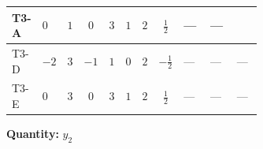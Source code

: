 \documentclass[8pt]{article}
\begin{document}
\begin{landscape}
\begin{longtable}{@{}llcccccc >{\raggedright\arraybackslash}p{0.21\linewidth} >{\raggedright\arraybackslash}p{0.21\linewidth} >{\raggedright\arraybackslash}p{0.21\linewidth}@{}}
\midrule
T3-A & $0$ & $1$ & $0$ & $3$ & $1$ & $2$ & $\frac{1}{2}$ & --- & --- & \scriptsize\adjustbox{max width=\linewidth}{$\begin{gathered} +\frac{1}{2} (\left({y_1}\,\left({y_1}\right)^{\dagger}\,{y_2}\right)_{ij}+\left({Y_e}\,\left({Y_e}\right)^{\dagger}\,{y_2}\right)_{ij}+3 \left({y_2}\,\left({y_2}\right)^{\dagger}\,{y_2}\right)_{ij})\end{gathered}$} \\
\midrule
T3-D & $-2$ & $3$ & $-1$ & $1$ & $0$ & $2$ & $-\frac{1}{2}$ & --- & --- & --- \\
\midrule
T3-E & $0$ & $3$ & $0$ & $3$ & $1$ & $2$ & $\frac{1}{2}$ & --- & --- & --- \\
\midrule
\bottomrule
\end{longtable}
\clearpage
\noindent\textbf{Quantity: }$y_2$\par\smallskip

\end{landscape}
\end{document}
